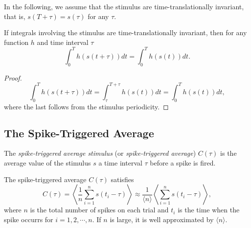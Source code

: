 \begin{asm}
  In the following, we assume that the stimulus are time-translationally invariant, that is, $s(T+\tau) = s(\tau)$ for any $\tau$.
\end{asm}

\begin{prop}
  If integrals involving the stimulus are time-translationally invariant,
  then for any function $h$ and time interval $\tau $
  \begin{equation}
    \label{equ:1.18}
    \int_0^T h(s(t+\tau)) dt = \int_0^T h(s(t)) dt.
  \end{equation}
  \begin{proof}
    \begin{displaymath}
      \int_0^T h(s(t+\tau)) dt = \int_{\tau}^{T+\tau} h(s(t)) dt = \int_0^T h(s(t)) dt,
    \end{displaymath}
    where the last follows from the stimulus periodicity.
  \end{proof}
\end{prop}

\subsection{The Spike-Triggered Average}
\begin{defn}
  \label{defn:Spi-Tri Ave}
  The \emph{spike-triggered average stimulus} (or \emph{spike-triggered average}) $C(\tau)$ is the average value of the stimulus $s$ a time interval $\tau$
  before a spike is fired.
\end{defn}

\begin{prop}
  The spike-triggered average $C(\tau)$ satisfies
  \begin{equation}
    \label{equ:1.19}
    C(\tau) = \left \langle \frac{1}{n} \sum_{i=1}^{n} s(t_i - \tau) \right \rangle \approx \frac{1}{\langle n \rangle} \left \langle \sum_{i=1}^n s(t_i - \tau) \right \rangle,
  \end{equation}
  where $n$ is the total number of spikes on each trial and $t_i$ is the time when the spike occurrs for $i = 1, 2, \cdots, n$.  If $n$ is large, it is well approximated by $\langle n \rangle$.
\end{prop}


